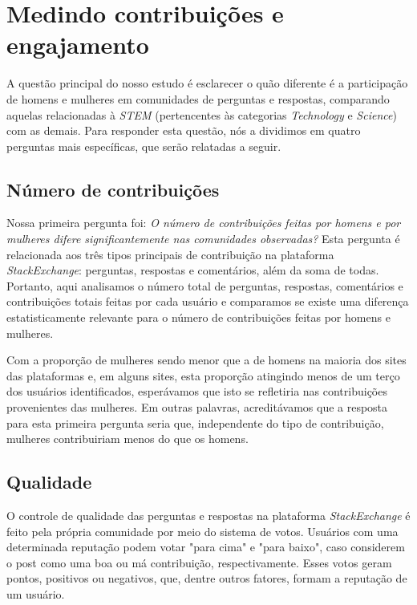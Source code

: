 \section{Medindo contribuições e engajamento}

A questão principal do nosso estudo é esclarecer o quão diferente é a participação de homens e mulheres em comunidades de perguntas e respostas, comparando aquelas relacionadas à \emph{STEM} (pertencentes às categorias \emph{Technology} e \emph{Science}) com as demais. Para responder esta questão, nós a dividimos em quatro perguntas mais específicas, que serão relatadas a seguir.

\subsection{Número de contribuições}

Nossa primeira pergunta foi: \textit{O número de contribuições feitas por homens e por mulheres difere significantemente nas comunidades observadas?} Esta pergunta é relacionada aos três tipos principais de contribuição na plataforma \emph{StackExchange}: perguntas, respostas e comentários, além da soma de todas. Portanto, aqui analisamos o número total de perguntas, respostas, comentários e contribuições totais feitas por cada usuário e comparamos se existe uma diferença estatisticamente relevante para o número de contribuições feitas por homens e mulheres.

Com a proporção de mulheres sendo menor que a de homens na maioria dos sites das plataformas e, em alguns sites, esta proporção atingindo menos de um terço dos usuários identificados, esperávamos que isto se refletiria nas contribuições provenientes das mulheres. Em outras palavras, acreditávamos que a resposta para esta primeira pergunta seria que, independente do tipo de contribuição, mulheres contribuiriam menos do que os homens.

\subsection{Qualidade}

O controle de qualidade das perguntas e respostas na plataforma \emph{StackExchange} é feito pela própria comunidade por meio do sistema de votos. Usuários com uma determinada reputação podem votar "para cima" e "para baixo", caso considerem o post como uma boa ou má contribuição, respectivamente. Esses votos geram pontos, positivos ou negativos, que, dentre outros fatores, formam a reputação de um usuário. 

